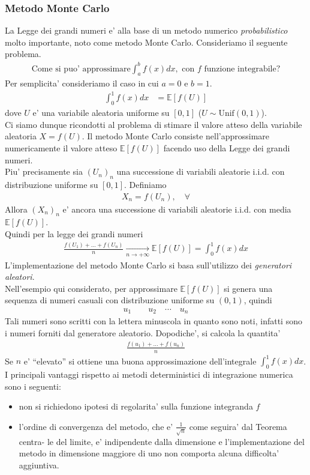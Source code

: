\documentclass[a4paper,12pt]{article}
\begin{document}
\subsubsection{Metodo Monte Carlo}
La Legge dei grandi numeri e' alla base di un metodo numerico \textit{probabilistico} molto importante, noto come metodo Monte Carlo. Consideriamo il seguente problema. 
\begin{align}
  \text{Come si puo' approssimare} \int_{a}^b f(x) dx, \text{ con $f$ funzione integrabile?}
\end{align}
Per semplicita' consideriamo il caso in cui $a=0$ e $b=1$.\\
\begin{align*}
  \int_{0}^1 f(x) dx & = \mathbb{E}[f(U)]
\end{align*}
dove $U$ e' una variabile aleatoria uniforme su $[0,1]$ ($U \sim \text{Unif}(0,1)$).\\
Ci siamo dunque ricondotti al problema di stimare il valore atteso della variabile aleatoria $X=f(U)$. Il metodo Monte Carlo consiste nell’approssimare numericamente il valore atteso $\mathbb{E}[f(U)]$ facendo uso della Legge dei grandi numeri.\\
Piu' precisamente sia $(U_n)_n$ una successione di variabili aleatorie i.i.d. con distribuzione uniforme su $[0,1]$. Definiamo
\begin{align}
  X_n = f(U_n), \quad \forall
\end{align}
Allora $(X_n)_n$ e' ancora una successione di variabili aleatorie i.i.d. con media $\mathbb{E}[f(U)]$.\\
Quindi per la legge dei grandi numeri
\begin{align}
  \frac{f(U_1) + \dots + f(U_n)}{n} \xrightarrow[n \to +\infty]{} \mathbb{E}[f(U)] = \int_{0}^1 f(x) dx
\end{align}
L’implementazione del metodo Monte Carlo si basa sull’utilizzo dei \textit{generatori aleatori}.\\
Nell’esempio qui considerato, per approssimare $\mathbb{E}[f(U)]$ si genera una sequenza di numeri casuali con distribuzione uniforme su $(0, 1)$, quindi
\begin{align}
  u_1 \qquad u_2 \quad \cdots \quad u_n
\end{align}
Tali numeri sono scritti con la lettera minuscola in quanto sono noti, infatti sono i numeri forniti dal generatore aleatorio. Dopodiche', si calcola la quantita'
\begin{align*}
  \frac{f(u_1) + \dots + f(u_n)}{n}
\end{align*}
Se $n$ e' “elevato” si ottiene una buona approssimazione dell’integrale $\int_0^1 f(x) dx$.\\
I principali vantaggi rispetto ai metodi deterministici di integrazione numerica sono i seguenti:
\begin{itemize}
  \item non si richiedono ipotesi di regolarita' sulla funzione integranda $f$
  \item l’ordine di convergenza del metodo, che e' $\frac{1}{\sqrt{n}}$ come seguira' dal Teorema centra-
le del limite, e' indipendente dalla dimensione e l’implementazione del metodo in
dimensione maggiore di uno non comporta alcuna difficolta' aggiuntiva.
\end{itemize}
\end{document}
